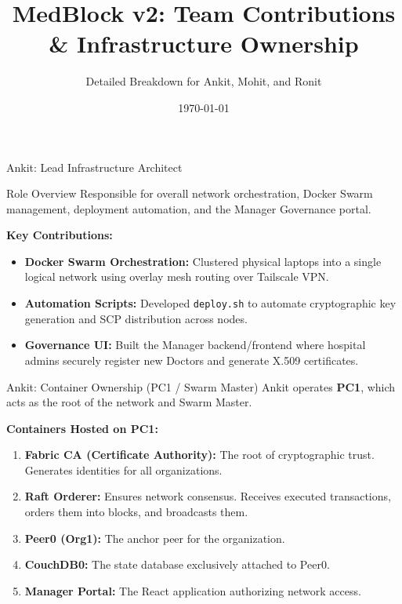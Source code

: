 \documentclass[10pt,aspectratio=169]{beamer}
\title[MedBlock Contributions]{MedBlock v2: Team Contributions \& Infrastructure Ownership}
\subtitle{Detailed Breakdown for Ankit, Mohit, and Ronit}
\date{\today}
\begin{document}
\begin{frame}
    \titlepage
\end{frame}


\begin{frame}{Ankit: Lead Infrastructure Architect}
    \begin{block}{Role Overview}
        Responsible for overall network orchestration, Docker Swarm management, deployment automation, and the Manager Governance portal.
    \end{block}
    \vspace{0.5cm}
    \textbf{Key Contributions:}
    \begin{itemize}
        \item \textbf{Docker Swarm Orchestration:} Clustered physical laptops into a single logical network using overlay mesh routing over Tailscale VPN.
        \item \textbf{Automation Scripts:} Developed \texttt{deploy.sh} to automate cryptographic key generation and SCP distribution across nodes.
        \item \textbf{Governance UI:} Built the Manager backend/frontend where hospital admins securely register new Doctors and generate X.509 certificates.
    \end{itemize}
\end{frame}

\begin{frame}{Ankit: Container Ownership (PC1 / Swarm Master)}
    Ankit operates \textbf{PC1}, which acts as the root of the network and Swarm Master.
    \vspace{0.5cm}
    
    \textbf{Containers Hosted on PC1:}
    \begin{enumerate}
        \item \textbf{Fabric CA (Certificate Authority):} The root of cryptographic trust. Generates identities for all organizations.
        \item \textbf{Raft Orderer:} Ensures network consensus. Receives executed transactions, orders them into blocks, and broadcasts them.
        \item \textbf{Peer0 (Org1):} The anchor peer for the organization.
        \item \textbf{CouchDB0:} The state database exclusively attached to Peer0.
        \item \textbf{Manager Portal:} The React application authorizing network access.
    \end{enumerate}
\end{frame}
\end{document}
